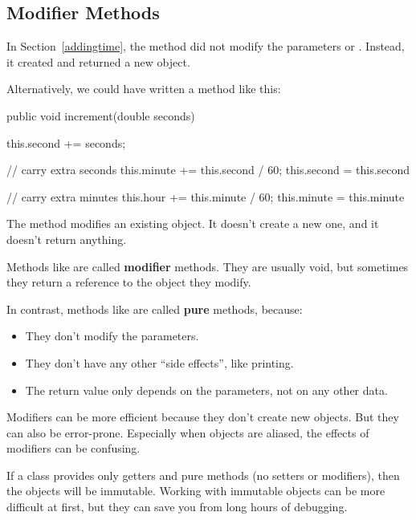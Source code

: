 \subsection*{Modifier Methods}

In Section~\ref{addingtime}, the  method did not modify the parameters  or .
Instead, it created and returned a new  object.

Alternatively, we could have written a method like this:

\begin{code}
public void increment(double seconds) {
    this.second += seconds;

    // carry extra seconds
    this.minute += this.second / 60;
    this.second = this.second %

    // carry extra minutes
    this.hour += this.minute / 60;
    this.minute = this.minute %
}
\end{code}

The  method modifies an existing  object.
It doesn't create a new one, and it doesn't return anything.


Methods like  are called {\bf modifier} methods.
They are usually void, but sometimes they return a reference to the object they modify.


In contrast, methods like  are called {\bf pure} methods, because:

\begin{itemize}

\item They don't modify the parameters.

\item They don't have any other ``side effects'', like printing.

\item The return value only depends on the parameters, not on any other data.

\end{itemize}

Modifiers can be more efficient because they don't create new objects.
But they can also be error-prone.
Especially when objects are aliased, the effects of modifiers can be confusing.


If a class provides only getters and pure methods (no setters or modifiers), then the objects will be immutable.
Working with immutable objects can be more difficult at first, but they can save you from long hours of debugging.


